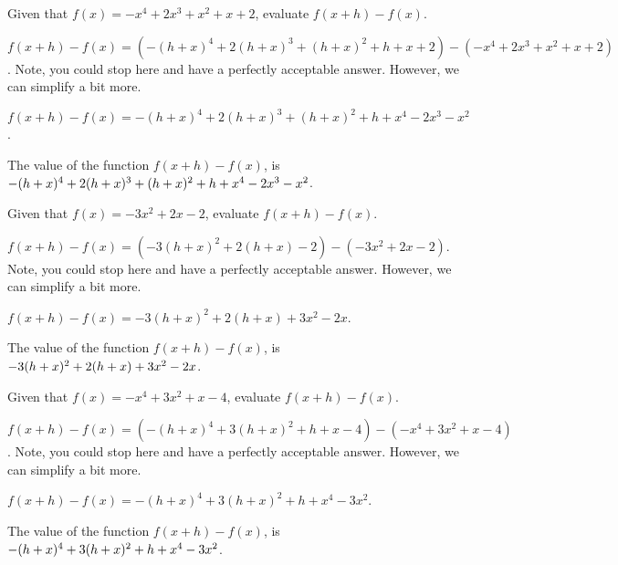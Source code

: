 \begin{shuffle}
\begin{exercise}
Given that $f(x)=-x^4+2 x^3+x^2+x+2$, evaluate $f(x+h)-f(x)$.
\begin{solution}
\begin{hint}
$f(x+h)-f(x)=(-(h+x)^4+2 (h+x)^3+(h+x)^2+h+x+2)-(-x^4+2 x^3+x^2+x+2)$. Note, you could stop here and have a perfectly acceptable answer. However, we can simplify a bit more.
\end{hint}
\begin{hint}
$f(x+h)-f(x)=-(h+x)^4+2 (h+x)^3+(h+x)^2+h+x^4-2 x^3-x^2$.
\end{hint}
The value of the function $f(x+h)-f(x)$, is ${-(h+x)^4+2 (h+x)^3+(h+x)^2+h+x^4-2 x^3-x^2}$.
\end{solution}
\end{exercise}

\begin{exercise}
Given that $f(x)=-3 x^2+2 x-2$, evaluate $f(x+h)-f(x)$.
\begin{solution}
\begin{hint}
$f(x+h)-f(x)=(-3 (h+x)^2+2 (h+x)-2)-(-3 x^2+2 x-2)$. Note, you could stop here and have a perfectly acceptable answer. However, we can simplify a bit more.
\end{hint}
\begin{hint}
$f(x+h)-f(x)=-3 (h+x)^2+2 (h+x)+3 x^2-2 x$.
\end{hint}
The value of the function $f(x+h)-f(x)$, is ${-3 (h+x)^2+2 (h+x)+3 x^2-2 x}$.
\end{solution}
\end{exercise}

\begin{exercise}
Given that $f(x)=-x^4+3 x^2+x-4$, evaluate $f(x+h)-f(x)$.
\begin{solution}
\begin{hint}
$f(x+h)-f(x)=(-(h+x)^4+3 (h+x)^2+h+x-4)-(-x^4+3 x^2+x-4)$. Note, you could stop here and have a perfectly acceptable answer. However, we can simplify a bit more.
\end{hint}
\begin{hint}
$f(x+h)-f(x)=-(h+x)^4+3 (h+x)^2+h+x^4-3 x^2$.
\end{hint}
The value of the function $f(x+h)-f(x)$, is ${-(h+x)^4+3 (h+x)^2+h+x^4-3 x^2}$.
\end{solution}
\end{exercise}


\end{shuffle}
